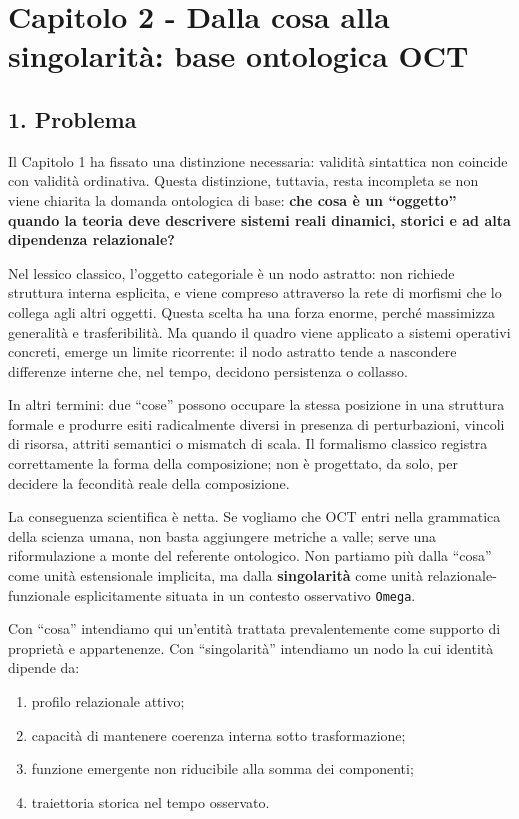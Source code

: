 \chapter{Capitolo 2 - Dalla cosa alla singolarità: base ontologica OCT}

\section{1. Problema}

Il Capitolo 1 ha fissato una distinzione necessaria: validità sintattica non coincide con validità ordinativa. Questa distinzione, tuttavia, resta incompleta se non viene chiarita la domanda ontologica di base: \textbf{che cosa è un ``oggetto'' quando la teoria deve descrivere sistemi reali dinamici, storici e ad alta dipendenza relazionale?}

Nel lessico classico, l'oggetto categoriale è un nodo astratto: non richiede struttura interna esplicita, e viene compreso attraverso la rete di morfismi che lo collega agli altri oggetti. Questa scelta ha una forza enorme, perché massimizza generalità e trasferibilità. Ma quando il quadro viene applicato a sistemi operativi concreti, emerge un limite ricorrente: il nodo astratto tende a nascondere differenze interne che, nel tempo, decidono persistenza o collasso.

In altri termini: due ``cose'' possono occupare la stessa posizione in una struttura formale e produrre esiti radicalmente diversi in presenza di perturbazioni, vincoli di risorsa, attriti semantici o mismatch di scala. Il formalismo classico registra correttamente la forma della composizione; non è progettato, da solo, per decidere la fecondità reale della composizione.

La conseguenza scientifica è netta. Se vogliamo che OCT entri nella grammatica della scienza umana, non basta aggiungere metriche a valle; serve una riformulazione a monte del referente ontologico. Non partiamo più dalla ``cosa'' come unità estensionale implicita, ma dalla \textbf{singolarità} come unità relazionale-funzionale esplicitamente situata in un contesto osservativo \texttt{Omega}.

Con ``cosa'' intendiamo qui un'entità trattata prevalentemente come supporto di proprietà e appartenenze. Con ``singolarità'' intendiamo un nodo la cui identità dipende da:

\begin{enumerate}
\def\labelenumi{\arabic{enumi}.}
\tightlist
\item
  profilo relazionale attivo;
\item
  capacità di mantenere coerenza interna sotto trasformazione;
\item
  funzione emergente non riducibile alla somma dei componenti;
\item
  traiettoria storica nel tempo osservato.
\end{enumerate}

